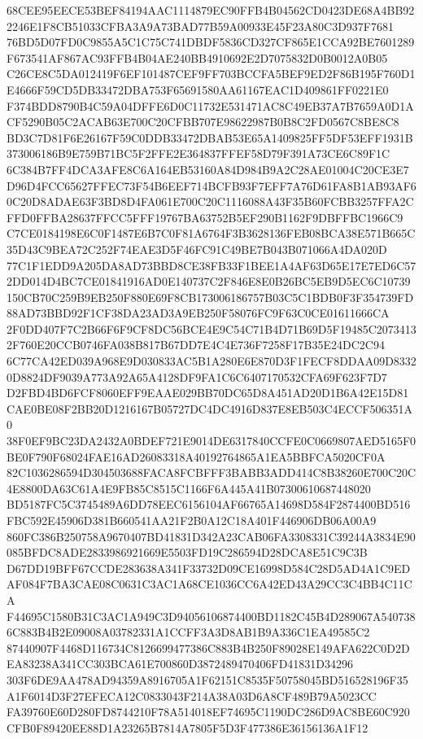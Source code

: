 \documentclass[UTF8,fontset=fandol,zihao=-4,a4paper]{ctexart}
\begin{document}
{{68CEE95EECE53BEF84194AAC1114879EC90FFB4B04562CD0423DE68A4BB922246E1F8CB51033CFBA3A9A73BAD77B59A00933E45F23A80C3D937F7681
76BD5D07FD0C9855A5C1C75C741DBDF5836CD327CF865E1CCA92BE7601289F673541AF867AC93FFB4B04AE240BB4910692E2D7075832D0B0012A0B05
C26CE8C5DA012419F6EF101487CEF9FF703BCCFA5BEF9ED2F86B195F760D1E4666F59CD5DB33472DBA753F65691580AA61167EAC1D409861FF0221E0
F374BDD8790B4C59A04DFFE6D0C11732E531471AC8C49EB37A7B7659A0D1ACF5290B05C2ACAB63E700C20CFBB707E98622987B0B8C2FD0567C8BE8C8
BD3C7D81F6E26167F59C0DDB33472DBAB53E65A1409825FF5DF53EFF1931B373006186B9E759B71BC5F2FFE2E364837FFEF58D79F391A73CE6C89F1C
6C384B7FF4DCA3AFE8C6A164EB53160A84D984B9A2C28AE01004C20CE3E7D96D4FCC65627FFEC73F54B6EEF714BCFB93F7EFF7A76D61FA8B1AB93AF6
0C20D8ADAE63F3BD8D4FA061E700C20C1116088A43F35B60FCBB3257FFA2CFFD0FFBA28637FFCC5FFF19767BA63752B5EF290B1162F9DBFFBC1966C9
C7CE0184198E6C0F1487E6B7C0F81A6764F3B3628136FEB08BCA38E571B665C35D43C9BEA72C252F74EAE3D5F46FC91C49BE7B043B071066A4DA020D
77C1F1EDD9A205DA8AD73BBD8CE38FB33F1BEE1A4AF63D65E17E7ED6C572DD014D4BC7CE01841916AD0E140737C2F846E8E0B26BC5EB9D5EC6C10739
150CB70C259B9EB250F880E69F8CB173006186757B03C5C1BDB0F3F354739FD88AD73BBD92F1CF38DA23AD3A9EB250F58076FC9F63C0CE01611666CA
2F0DD407F7C2B66F6F9CF8DC56BCE4E9C54C71B4D71B69D5F19485C20734132F760E20CCB0746FA038B817B67DD7E4C4E736F7258F17B35E24DC2C94
6C77CA42ED039A968E9D030833AC5B1A280E6E870D3F1FECF8DDAA09D83320D8824DF9039A773A92A65A4128DF9FA1C6C6407170532CFA69F623F7D7
D2FBD4BD6FCF8060EFF9EAAE029BB70DC65D8A451AD20D1B6A42E15D81CAE0BE08F2BB20D1216167B05727DC4DC4916D837E8EB503C4ECCF506351A0
38F0EF9BC23DA2432A0BDEF721E9014DE6317840CCFE0C0669807AED5165F0BE0F790F68024FAE16AD26083318A40192764865A1EA5BBFCA5020CF0A
82C1036286594D304503688FACA8FCBFFF3BABB3ADD414C8B38260E700C20C4E8800DA63C61A4E9FB85C8515C1166F6A445A41B07300610687448020
BD5187FC5C3745489A6DD78EEC6156104AF66765A14698D584F2874400BD516FBC592E45906D381B660541AA21F2B0A12C18A401F446906DB06A00A9
860FC386B250758A9670407BD41831D342A23CAB06FA3308331C39244A3834E90085BFDC8ADE2833986921669E5503FD19C286594D28DCA8E51C9C3B
D67DD19BFF67CCDE283638A341F33732D09CE16998D584C28D5AD4A1C9EDAF084F7BA3CAE08C0631C3AC1A68CE1036CC6A42ED43A29CC3C4BB4C11CA
F44695C1580B31C3AC1A949C3D94056106874400BD1182C45B4D289067A5407386C883B4B2E09008A03782331A1CCFF3A3D8AB1B9A336C1EA49585C2
87440907F4468D116734C8126699477386C883B4B250F89028E149AFA622C0D2DEA83238A341CC303BCA61E700860D3872489470406FD41831D34296
303F6DE9AA478AD94359A8916705A1F62151C8535F50758045BD516528196F35A1F6014D3F27EFECA12C0833043F214A38A03D6A8CF489B79A5023CC
FA39760E60D280FD8744210F78A514018EF74695C1190DC286D9AC8BE60C920CFB0F89420EE88D1A23265B7814A7805F5D3F477386E36156136A1F12
}}
\end{document}
